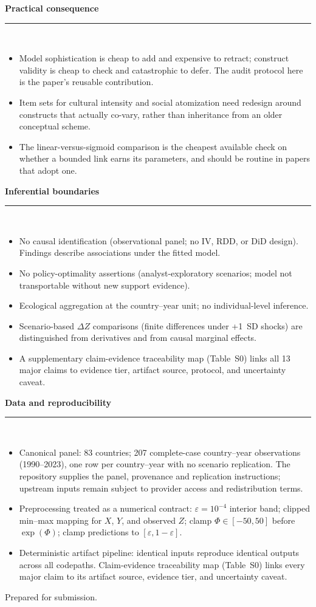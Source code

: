 \documentclass[11pt]{article}
\newcommand{\SubRule}{\color{black}\rule{\linewidth}{0.4pt}}
\newcommand{\Section}[1]{\needspace{5\baselineskip}\vspace{0.85em}\noindent\textbf{#1}\\[-0.25em]\SubRule\\[0.45em]}
\begin{document}
\Section{Practical consequence}
\begin{itemize}
    \setlength{\itemsep}{0.40em}
    \item Model sophistication is cheap to add and expensive to retract; construct validity is cheap to check and catastrophic to defer. The audit protocol here is the paper's reusable contribution.
    \item Item sets for cultural intensity and social atomization need redesign around constructs that actually co-vary, rather than inheritance from an older conceptual scheme.
    \item The linear-versus-sigmoid comparison is the cheapest available check on whether a bounded link earns its parameters, and should be routine in papers that adopt one.
\end{itemize}

\Section{Inferential boundaries}
\begin{itemize}
    \setlength{\itemsep}{0.40em}
    \item No causal identification (observational panel; no IV, RDD, or DiD design). Findings describe associations under the fitted model.
    \item No policy-optimality assertions (analyst-exploratory scenarios; model not transportable without new support evidence).
    \item Ecological aggregation at the country--year unit; no individual-level inference.
    \item Scenario-based $\Delta Z$ comparisons (finite differences under +1~SD shocks) are distinguished from derivatives and from causal marginal effects.
    \item A supplementary claim-evidence traceability map (Table~S0) links all 13 major claims to evidence tier, artifact source, protocol, and uncertainty caveat.
\end{itemize}

\Section{Data and reproducibility}
\begin{itemize}
    \setlength{\itemsep}{0.40em}
    \item Canonical panel: 83 countries; 207 complete-case country--year observations (1990--2023), one row per country--year with no scenario replication. The repository supplies the panel, provenance and replication instructions; upstream inputs remain subject to provider access and redistribution terms.
    \item Preprocessing treated as a numerical contract: $\varepsilon=10^{-4}$ interior band; clipped min--max mapping for $X$, $Y$, and observed $Z$; clamp $\Phi\in[-50,50]$ before $\exp(\Phi)$; clamp predictions to $[\varepsilon,1-\varepsilon]$.
    \item Deterministic artifact pipeline: identical inputs reproduce identical outputs across all codepaths. Claim-evidence traceability map (Table~S0) links every major claim to its artifact source, evidence tier, and uncertainty caveat.
\end{itemize}

\vfill
{\small\color{black}Prepared for submission.}\par

\endgroup
\end{document}
